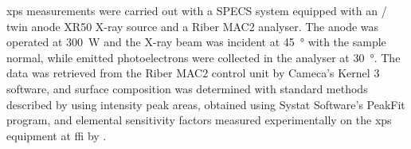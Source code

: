 \Ac{xps} measurements were carried out with a SPECS system equipped with an / twin anode XR50 X-ray source and a Riber MAC2 analyser. The  anode was operated at \SI{300}{\watt} and the X-ray beam was incident at \SI{45}{\degree} with the sample normal, while emitted photoelectrons were collected in the analyser at \SI{30}{\degree}. The data was retrieved from the Riber MAC2 control unit by Cameca's Kernel 3 software, and surface composition was determined with standard methods described by \citet{moulder2000handbook} using intensity peak areas, obtained using Systat Software's PeakFit program, and elemental sensitivity factors measured experimentally on the \ac{xps} equipment at \ac{ffi} by \citet{hirsch1999x-ray}.%



